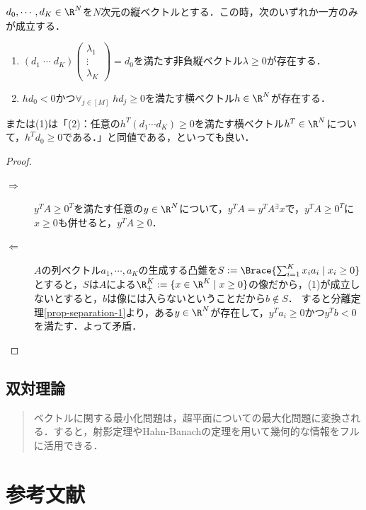 \documentclass[uplatex,dvipdfmx]{jsreport}
\begin{document}
\begin{theorem}
    $d_0,\cdots,d_K\in\R^N$を$N$次元の縦ベクトルとする．この時，次のいずれか一方のみが成立する．
    \begin{enumerate}
        \item $(d_1\;\cdots\;d_K)\begin{pmatrix}\lambda_1\\\vdots\\\lambda_K\end{pmatrix}=d_0$を満たす非負縦ベクトル$\lambda\ge 0$が存在する．
        \item $hd_0<0$かつ$\forall_{j\in[M]}\;hd_j\ge 0$を満たす横ベクトル$h\in\R^N$が存在する．
    \end{enumerate}
    または(1)は「(2)：任意の$h^T(d_1\cdots d_K)\ge 0$を満たす横ベクトル$h^T\in\R^N$について，$h^Td_0\ge 0$である．」と同値である，といっても良い．
\end{theorem}
\begin{proof}\mbox{}
    \begin{description}
        \item[$\Rightarrow$] $y^TA\ge 0^T$を満たす任意の$y\in\R^N$について，$y^TA=y^TA{}^\exists x$で，$y^TA\ge 0^T$に$x\ge 0$も併せると，$y^TA\ge 0$．
        \item[$\Leftarrow$] $A$の列ベクトル$a_1,\cdots,a_K$の生成する凸錐を$S:=\Brace{\sum^K_{i=1}x_ia_i\mid x_i\ge 0}$とすると，$S$は$A$による$\R^K_+:=\{x\in\R^K\mid x\ge 0\}$の像だから，(1)が成立しないとすると，$b$は像には入らないということだから$b\notin S$．
        すると分離定理\ref{prop-separation-1}より，ある$y\in\R^N$が存在して，$y^Ta_i\ge 0$かつ$y^Tb<0$を満たす．よって矛盾．
    \end{description}
\end{proof}

\section{双対理論}

\begin{quotation}
    ベクトルに関する最小化問題は，超平面についての最大化問題に変換される．すると，射影定理やHahn-Banachの定理を用いて幾何的な情報をフルに活用できる．
\end{quotation}

\chapter{参考文献}
\end{document}
